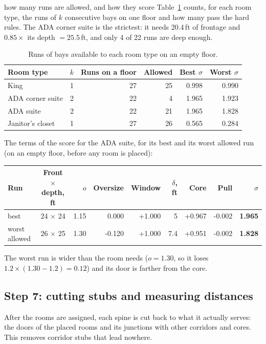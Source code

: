 \documentclass[10pt,a4paper]{article}
\begin{document}
\begin{example}{how many runs are allowed, and how they score}
Table~\ref{tab:runs} counts, for each room type, the runs of $k$ consecutive bays on one floor and how many pass the
hard rules. The ADA corner suite is the strictest: it needs 20.4\,ft of frontage and
$0.85 \times$ its depth $= 25.5$\,ft, and only 4 of 22 runs are deep enough.
\begin{table}[H]\centering\small\caption{Runs of bays available to each room type on an empty floor.}\label{tab:runs}
\begin{tabular}{@{}l r r r r r@{}}
\toprule
\textbf{Room type} & \textbf{$k$} & \textbf{Runs on a floor} & \textbf{Allowed} & \textbf{Best $\sigma$} & \textbf{Worst $\sigma$} \\ \midrule
King & 1 & 27 & 25 & 0.998 & 0.990 \\
ADA corner suite & 2 & 22 & 4 & 1.965 & 1.923 \\
ADA suite & 2 & 22 & 21 & 1.965 & 1.828 \\
Janitor's closet & 1 & 27 & 26 & 0.565 & 0.284 \\
\bottomrule
\end{tabular}
\end{table}
The terms of the score for the ADA suite, for its best and its worst allowed run (on an empty floor, before any
room is placed):
\begin{center}\centering\small
\begin{tabular}{@{}l c r r r r r r r@{}}
\toprule
\textbf{Run} & \textbf{Front $\times$ depth, ft} & \textbf{$o$} & \textbf{Oversize} & \textbf{Window} & \textbf{$\delta$, ft} & \textbf{Core} & \textbf{Pull} & \textbf{$\sigma$} \\ \midrule
best & 24 $\times$ 24 & 1.15 & 0.000 & +1.000 & 5 & +0.967 & -0.002 & \textbf{1.965} \\
worst allowed & 26 $\times$ 25 & 1.30 & -0.120 & +1.000 & 7.4 & +0.951 & -0.002 & \textbf{1.828} \\
\bottomrule
\end{tabular}
\end{center}
The worst run is wider than the room needs ($o = 1.30$, so it loses $1.2 \times (1.30 - 1.2) = 0.12$)
and its door is farther from the core.
\end{example}

\subsection{Step 7: cutting stubs and measuring distances}
After the rooms are assigned, each spine is cut back to what it actually serves: the doors of the placed rooms and its
junctions with other corridors and cores. This removes corridor stubs that lead nowhere.
\end{document}
